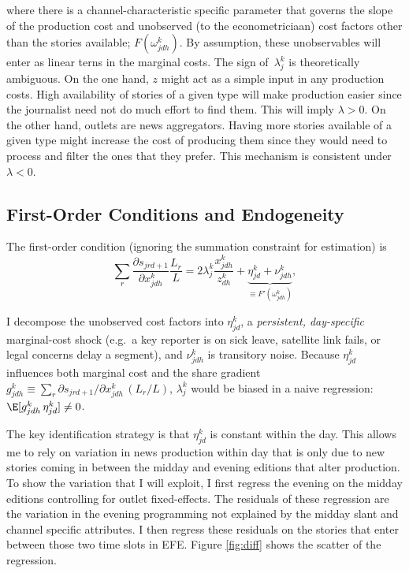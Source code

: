 \documentclass[12pt]{article}
\begin{document}
where there is a channel-characteristic specific parameter that governs the slope of the production cost and unobserved (to the econometriciaan) cost factors other than the stories available; $ F(\omega^k_{jdh})$. By assumption, these unobservables will enter as linear terns in the marginal costs. The sign of~$\lambda_j^k$
is theoretically ambiguous. On the one hand, $z$ might act as a simple input in any production costs. High availability of stories of a given type will make production easier since the journalist need not do much effort to find them. This will imply $ \lambda>0$. On the other hand, outlets are news aggregators. Having more stories available of a given type might increase the cost of producing them since they would need to process and filter the ones that they prefer. This mechanism is consistent under $ \lambda<0$.


\subsection*{First-Order Conditions and Endogeneity}

The first-order condition (ignoring the summation constraint for estimation) is
\begin{equation}\label{eq:focs}
	\sum_{r}\frac{\partial s_{jrd+1}}{\partial x_{jdh}^k}\frac{L_r}{L}=	2\lambda_j^k\frac{x_{jdh}^k}{z_{dh}^k} +\underbrace{	\eta_{jd}^k+\nu_{jdh}^k}_{\equiv F'(\omega_{jdh}^k)},
\end{equation}


I decompose the unobserved cost factors into 
$\eta_{jd}^k$, a \emph{persistent, day-specific} marginal-cost shock
(e.g.\ a key reporter is on sick leave, satellite link fails, or legal concerns delay a segment),
and $\nu_{jdh}^k$ is transitory noise. 
Because $\eta_{jd}^k$ influences both marginal cost and the share gradient
$g_{jdh}^k\equiv\sum_{r}\partial s_{jrd+1}/\partial x_{jdh}^k\,(L_r/L)$,
$\lambda_j^k$ would be biased in a naive regression: $\E[g_{jdh}^k\,\eta_{jd}^k]\neq0$.


The key identification strategy is that $\eta_{jd}^k$ is constant within the day. This allows me to rely on variation in news production within day that is only due to new stories coming in between the midday and evening editions that alter production.  To show the variation that I will exploit, I first regress the evening on the midday editions controlling for outlet fixed-effects. The residuals of these regression are the  variation in the evening programming not explained by the midday slant and channel specific attributes. I then regress these residuals on the stories that enter between those two time slots in EFE. Figure \ref{fig:diff} shows the scatter of the regression. 
\end{document}
